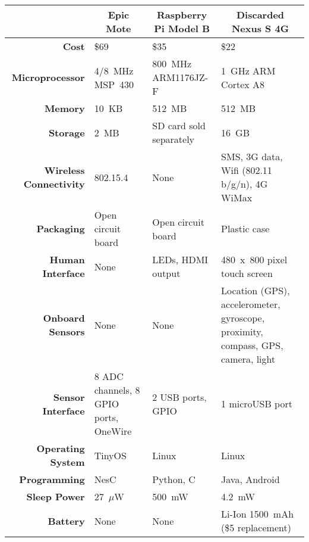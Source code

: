 \renewcommand{\arraystretch}{1.2}
\begin{table*}[t]
\begin{threeparttable}
{\scriptsize
\begin{tabularx}{\textwidth}{rXXX}

&
\multicolumn{1}{c}{\textbf{Epic Mote}} &
\multicolumn{1}{c}{\textbf{Raspberry Pi Model B}} &
\multicolumn{1}{c}{\textbf{Discarded Nexus S 4G}} \\ \toprule

\textbf{Cost} &
\$69 &
\$35 &
\$22\tnote{1} \\ \midrule

\textbf{Microprocessor} &
4/8~MHz MSP~430 &
800~MHz\tnote{2} ARM1176JZ-F &
1~GHz\tnote{2} ARM Cortex A8 \\

\textbf{Memory} &
10~KB &
512~MB &
512~MB \\

\textbf{Storage} &
2~MB &
SD card sold separately\tnote{3} &
16~GB \\ \midrule

\textbf{Wireless Connectivity} &
802.15.4 &
None &
SMS, 3G data, Wifi (802.11 b/g/n), 4G WiMax \\ \midrule

\textbf{Packaging} &
Open circuit board &
Open circuit board &
Plastic case \\

\textbf{Human Interface} &
None &
LEDs, HDMI output &
480~x~800 pixel touch screen \\ \midrule

\textbf{Onboard Sensors} &
None &
None &
Location (GPS), accelerometer, gyroscope, proximity, compass, GPS, camera,
light \\

\textbf{Sensor Interface} &
8 ADC channels, 8 GPIO ports, OneWire &
2 USB ports, GPIO &
1 microUSB port \\ \midrule

\textbf{Operating System} &
TinyOS &
Linux &
Linux \\

\textbf{Programming} &
NesC &
Python, C &
Java, Android \\ \midrule


\textbf{Sleep Power} &
27~$\mu$W &
500~mW\tnote{4} &
4.2~mW \\

\textbf{Battery} &
None &
None &
Li-Ion 1500~mAh (\$5 replacement) \\ \midrule


\end{tabularx}}
\end{threeparttable}
\end{table*}
